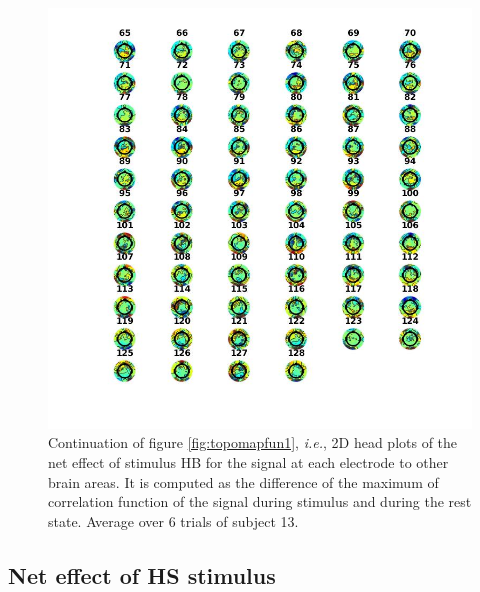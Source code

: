 \documentclass[a4paper]{article}
\begin{document}
\begin{figure}
    \centering
    \includegraphics[width=16cm]{HB2.jpg}
    \caption{Continuation of figure \ref{fig:topomapfun1}, \textit{i.e.}, 2D head plots of the net effect of stimulus HB for the signal at each electrode to other brain areas. It is computed as the difference of the maximum of correlation function of the signal during stimulus and during the rest state. Average over 6 trials of subject 13.}
    \label{fig:hb2}
\end{figure}

\subsection{Net effect of HS stimulus}
\end{document}

